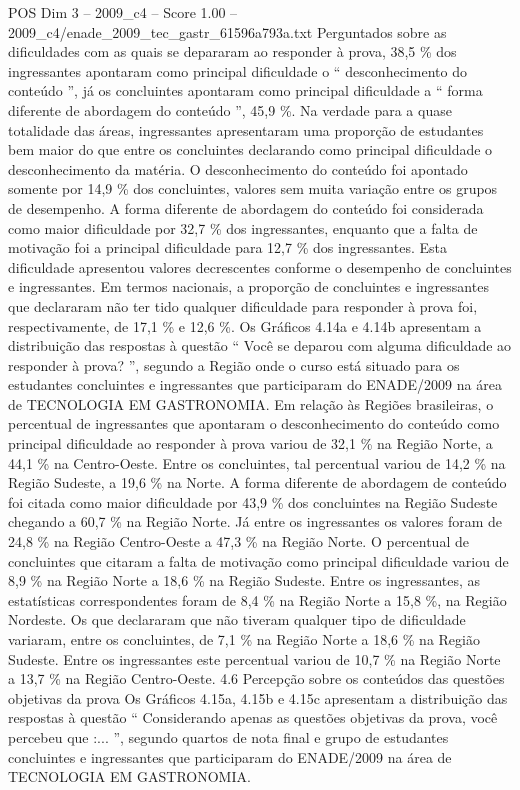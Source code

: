 \begin{textsample}{POS Dim 3 – 2009\_c4 – Score 1.00 – 2009\_c4/enade\_2009\_tec\_gastr\_61596a793a.txt}
Perguntados sobre as dificuldades com as quais se depararam ao responder à prova, 38,5 \% dos ingressantes apontaram como principal dificuldade o “ desconhecimento do conteúdo ”, já os concluintes apontaram como principal dificuldade a “ forma diferente de abordagem do conteúdo ”, 45,9 \%.
Na verdade para a quase totalidade das áreas, ingressantes apresentaram uma proporção de estudantes bem maior do que entre os concluintes declarando como principal dificuldade o desconhecimento da matéria.
O desconhecimento do conteúdo foi apontado somente por 14,9 \% dos concluintes, valores sem muita variação entre os grupos de desempenho.
A forma diferente de abordagem do conteúdo foi considerada como maior dificuldade por 32,7 \% dos ingressantes, enquanto que a falta de motivação foi a principal dificuldade para 12,7 \% dos ingressantes.
Esta dificuldade apresentou valores decrescentes conforme o desempenho de concluintes e ingressantes.
Em termos nacionais, a proporção de concluintes e ingressantes que declararam não ter tido qualquer dificuldade para responder à prova foi, respectivamente, de 17,1 \% e 12,6 \%.
Os Gráficos 4.14a e 4.14b apresentam a distribuição das respostas à questão “ Você se deparou com alguma dificuldade ao responder à prova? ”, segundo a Região onde o curso está situado para os estudantes concluintes e ingressantes que participaram do ENADE/2009 na área de TECNOLOGIA EM GASTRONOMIA.
Em relação às Regiões brasileiras, o percentual de ingressantes que apontaram o desconhecimento do conteúdo como principal dificuldade ao responder à prova variou de 32,1 \% na Região Norte, a 44,1 \% na Centro-Oeste.
Entre os concluintes, tal percentual variou de 14,2 \% na Região Sudeste, a 19,6 \% na Norte.
A forma diferente de abordagem de conteúdo foi citada como maior dificuldade por 43,9 \% dos concluintes na Região Sudeste chegando a 60,7 \% na Região Norte.
Já entre os ingressantes os valores foram de 24,8 \% na Região Centro-Oeste a 47,3 \% na Região Norte.
O percentual de concluintes que citaram a falta de motivação como principal dificuldade variou de 8,9 \% na Região Norte a 18,6 \% na Região Sudeste.
Entre os ingressantes, as estatísticas correspondentes foram de 8,4 \% na Região Norte a 15,8 \%, na Região Nordeste.
Os que declararam que não tiveram qualquer tipo de dificuldade variaram, entre os concluintes, de 7,1 \% na Região Norte a 18,6 \% na Região Sudeste.
Entre os ingressantes este percentual variou de 10,7 \% na Região Norte a 13,7 \% na Região Centro-Oeste. 4.6 Percepção sobre os conteúdos das questões objetivas da prova Os Gráficos 4.15a, 4.15b e 4.15c apresentam a distribuição das respostas à questão “ Considerando apenas as questões objetivas da prova, você percebeu que :... ”, segundo quartos de nota final e grupo de estudantes concluintes e ingressantes que participaram do ENADE/2009 na área de TECNOLOGIA EM GASTRONOMIA.

\end{textsample}
